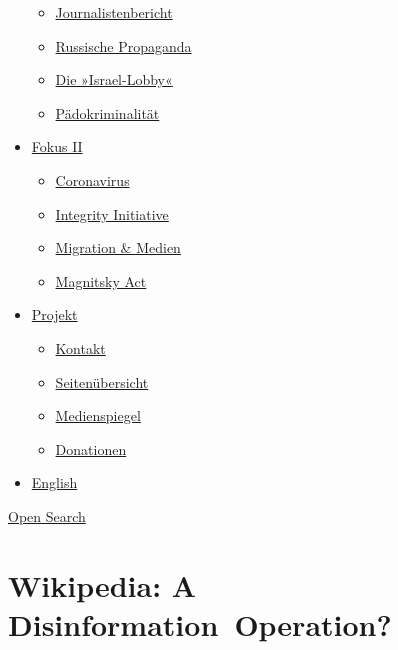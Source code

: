 \begin{itemize}
  \begin{itemize}
  \tightlist
  \item
    \href{https://swprs.org/bericht-eines-journalisten/}{Journalistenbericht}
  \item
    \href{https://swprs.org/russische-propaganda/}{Russische Propaganda}
  \item
    \href{https://swprs.org/die-israel-lobby-fakten-und-mythen/}{Die
    »Israel-Lobby«}
  \item
    \href{https://swprs.org/geopolitik-und-paedokriminalitaet/}{Pädokriminalität}
  \end{itemize}
\item
  \href{https://swprs.org/migration-und-medien/}{Fokus II}

  \begin{itemize}
  \tightlist
  \item
    \href{https://swprs.org/covid-19-hinweis-ii/}{Coronavirus}
  \item
    \href{https://swprs.org/die-integrity-initiative/}{Integrity
    Initiative}
  \item
    \href{https://swprs.org/migration-und-medien/}{Migration \& Medien}
  \item
    \href{https://swprs.org/der-fall-magnitsky/}{Magnitsky Act}
  \end{itemize}
\item
  \href{https://swprs.org/kontakt/}{Projekt}

  \begin{itemize}
  \tightlist
  \item
    \href{https://swprs.org/kontakt/}{Kontakt}
  \item
    \href{https://swprs.org/uebersicht/}{Seitenübersicht}
  \item
    \href{https://swprs.org/medienspiegel/}{Medienspiegel}
  \item
    \href{https://swprs.org/donationen/}{Donationen}
  \end{itemize}
\item
  \href{https://swprs.org/contact/}{English}
\end{itemize}

\protect\hyperlink{}{Open Search}

\hypertarget{wikipedia-a-disinformation-operation}{%
\section{Wikipedia: A
Disinformation~Operation?}\label{wikipedia-a-disinformation-operation}}

